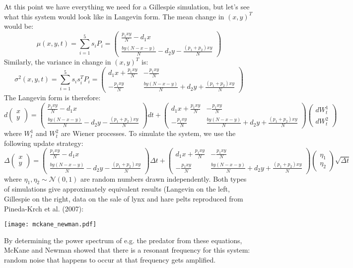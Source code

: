 \documentclass{article}
\begin{document}
At this point we have everything we need for a Gillespie simulation, but let's see what this system would look like in Langevin form. The mean change in $(x,y)^T$ would be:
\[ \mu(x,y,t) = \sum_{i=1}^5 s_i P_i = \begin{pmatrix} \frac{p_1 x y}{N}- d_1x\\ \frac{by(N-x-y)}{N} - d_2 y - \frac{(p_1+p_2)xy}{N} \end{pmatrix} \]
Similarly, the variance in change in $(x,y)^T$ is:
\[ \sigma^2(x,y,t) = \sum_{i=1}^5 s_i  s_i^TP_i = \begin{pmatrix} d_1 x + \frac{p_1xy}{N} & -\frac{p_1 x y}{N}\\ -\frac{p_1 x y}{N} & \frac{by(N-x-y)}{N} + d_2 y + \frac{(p_1+p_2)xy}{N} \end{pmatrix} \]
The Langevin form is therefore:
\[ d\begin{pmatrix} x \\ y \end{pmatrix} = \begin{pmatrix} \frac{p_1 x y}{N}- d_1x\\ \frac{by(N-x-y)}{N} - d_2 y - \frac{(p_1+p_2)xy}{N} \end{pmatrix} dt + \begin{pmatrix} d_1 x + \frac{p_1xy}{N} & -\frac{p_1 x y}{N}\\ -\frac{p_1 x y}{N} & \frac{by(N-x-y)}{N} + d_2 y + \frac{(p_1+p_2)xy}{N} \end{pmatrix} \begin{pmatrix} dW_t^1\\ dW_t^2 \end{pmatrix} \]
where $W_t^1$ and $W_t^2$ are Wiener processes. To simulate the system, we use the following update strategy:
\[ \Delta \begin{pmatrix} x \\ y \end{pmatrix} = \begin{pmatrix} \frac{p_1 x y}{N}- d_1x\\ \frac{by(N-x-y)}{N} - d_2 y - \frac{(p_1+p_2)xy}{N} \end{pmatrix} \Delta t + \begin{pmatrix} d_1 x + \frac{p_1xy}{N} & -\frac{p_1 x y}{N}\\ -\frac{p_1 x y}{N} & \frac{by(N-x-y)}{N} + d_2 y + \frac{(p_1+p_2)xy}{N} \end{pmatrix} \begin{pmatrix} \eta_1 \\ \eta_2 \end{pmatrix} \sqrt{\Delta t} \]
where $\eta_1, \eta_2 \sim \mathcal{N}(0,1)$ are random numbers drawn independently. Both types of simulations give approximately equivalent results (Langevin on the left, Gillespie on the right, data on the sale of lynx and hare pelts reproduced from Pineda-Krch et al. (2007):
\begin{center}
\texttt{[image: mckane\_newman.pdf]}
\end{center}
By determining the power spectrum of e.g. the predator from these equations, McKane and Newman showed that there is a resonant frequency for this system: random noise that happens to occur at that frequency gets amplified.
\end{document}
